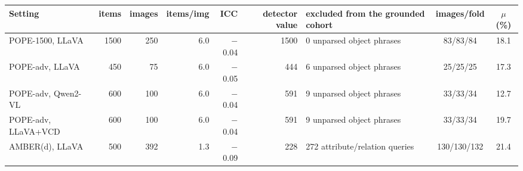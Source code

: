 \begin{tabular}{lrrrrrlcc}
\toprule
Setting & items & images & items/img & ICC & detector value & excluded from the grounded cohort & images/fold & $\mu$ (\%)\\
\midrule
POPE-1500, LLaVA & 1500 & 250 & 6.0 & $-$0.04 & 1500 & 0 unparsed object phrases & 83/83/84 & 18.1\\
POPE-adv, LLaVA & 450 & 75 & 6.0 & $-$0.05 & 444 & 6 unparsed object phrases & 25/25/25 & 17.3\\
POPE-adv, Qwen2-VL & 600 & 100 & 6.0 & $-$0.04 & 591 & 9 unparsed object phrases & 33/33/34 & 12.7\\
POPE-adv, LLaVA+VCD & 600 & 100 & 6.0 & $-$0.04 & 591 & 9 unparsed object phrases & 33/33/34 & 19.7\\
AMBER(d), LLaVA & 500 & 392 & 1.3 & $-$0.09 & 228 & 272 attribute/relation queries & 130/130/132 & 21.4\\
\bottomrule
\end{tabular}
